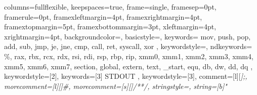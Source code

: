 {
    columns=fullflexible,
    keepspaces=true,
    frame=single,
    framesep=0pt,
    framerule=0pt,
    framexleftmargin=4pt,
    framexrightmargin=4pt,
    framextopmargin=5pt,
    framexbottommargin=3pt,
    xleftmargin=4pt,
    xrightmargin=4pt,
    backgroundcolor=\color{GrayCodeBlock},
    basicstyle=\ttfamily\color{BlackText},
    keywords={
        mov, push, pop, add, sub, jmp, je, jne, cmp, call, ret,
        syscall, xor
    },
    keywordstyle=\color{PurpleInstruction},
    ndkeywords={
        \%, rax, rbx, rcx, rdx, rsi, rdi, rsp, rbp, rip,
        xmm0, xmm1, xmm2, xmm3, xmm4, xmm5, xmm6, xmm7,
        section, global, extern, text, \_start, equ, db, 
        dw, dd, dq
    },
    keywordstyle=[2]\color{RedRegister},
    keywords=[3]{
        STDOUT
    },
    keywordstyle=[3]\color{BlueDirective},
    comment=[l][\color{GrayComment}\slshape]{;},
    morecomment=[l][\color{GrayComment}\slshape]{\#},
    morecomment=[s][\color{GrayComment}\slshape]{/*}{*/},
    stringstyle=\color{GreenString},
    string=[b]"
}
